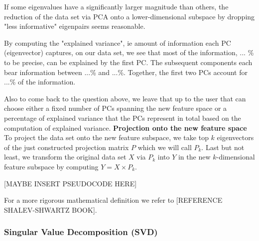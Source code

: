 \documentclass[journal, a4paper]{IEEEtran}
\begin{document}
If some eigenvalues have a significantly larger magnitude than others, the reduction of the data set via PCA onto a lower-dimensional subspace by dropping "less informative" eigenpairs seems reasonable.

By computing the "explained variance", ie amount of information each PC (eigenvector) captures, on our data set, we see that most of the information, ... \% to be precise, can be explained by the first PC. The subsequent components each bear information between ...\% and ...\%. Together, the first two PCs account for ...\% of the information.

Also to come back to the question above, we leave that up to the user that can choose either a fixed number of PCs spanning the new feature space or a percentage of explained variance that the PCs represent in total based on the computation of explained variance.
\newline
%
\textbf{Projection onto the new feature space}\\
To project the data set onto the new feature subspace, we take top \( k \) eigenvectors of the just constructed projection matrix \( P \) which we will call \( P_{k} \).
Last but not least, we transform the original data set \( X \) via \( P_{k} \) into \( Y \) in the new \(k\)-dimensional feature subspace by computing \( Y = X \times P_{k} \).

[MAYBE INSERT PSEUDOCODE HERE]

For a more rigorous mathematical definition we refer to [REFERENCE SHALEV-SHWARTZ BOOK].



\hfill 
\subsubsection{Singular Value Decomposition (SVD)}\label{svd}

\end{document}
